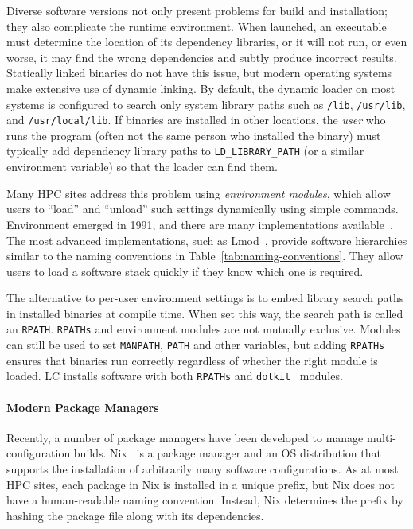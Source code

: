 Diverse software versions not only present problems for build and installation;
they also complicate the runtime environment. When launched, an executable
must determine the location of its dependency libraries, or it will not run,
or even worse, it may find the wrong dependencies and subtly produce incorrect results.
Statically linked binaries do not have this issue, but modern
operating systems make extensive use of dynamic linking.
By default, the dynamic loader on most systems is configured to search only
system library paths such as {\tt /lib}, {\tt /usr/lib}, and
{\tt /usr/local/lib}.  If binaries are installed in other locations, the
{\it user} who runs the program (often not the same person who
installed the binary) must typically add dependency library paths to
{\tt LD\_LIBRARY\_PATH} (or a similar environment variable) so that the loader
can find them.

Many HPC sites address this problem using {\it environment modules}, which 
allow users to ``load'' and ``unload'' such settings dynamically using simple 
commands. Environment emerged in 1991, and there are many implementations 
available~\cite{dotkit,furlani+:lisa91,furlani+:lisa96,mclay:lmod,mclay:lmod-tutorial}.
The most advanced implementations, such as Lmod~\cite{mclay:lmod,mclay:lmod-tutorial},
provide software hierarchies similar to the naming conventions in 
Table~\ref{tab:naming-conventions}. They allow users to load a software stack
quickly if they know which one is required.

The alternative to per-user environment settings is to embed library search 
paths in installed binaries at compile time. When set this way, the search 
path is called an {\tt RPATH}. {\tt RPATHs} and environment modules are not 
mutually exclusive. Modules can still be used to set {\tt MANPATH}, {\tt PATH}
and other variables, but adding {\tt RPATHs} ensures that binaries run correctly 
regardless of whether the right module is loaded. LC installs software with 
both {\tt RPATHs} and {\tt dotkit}~\cite{dotkit} modules.

\paragraph{Modern Package Managers}

Recently, a number of package managers have been developed to manage 
multi-configuration builds.
%
Nix~\cite{dolstra+:icfp08,dolstra+:lisa04}
is a package manager and an OS distribution that supports the installation of
arbitrarily many software configurations.  As at most HPC sites, each package
in Nix is installed in a unique prefix, but Nix does not have a human-readable
naming convention.  Instead, Nix determines the prefix by hashing the package
file along with its dependencies.

